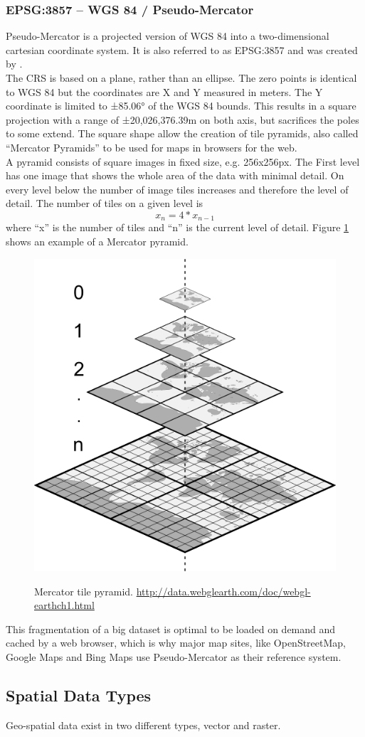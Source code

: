 \subsubsection{EPSG:3857 -- WGS 84 / Pseudo-Mercator}
Pseudo-Mercator is a projected version of WGS 84 into a two-dimensional cartesian coordinate system. It is also referred to as EPSG:3857 and was created by \cite{Grafarend1995}.\\
The CRS is based on a plane, rather than an ellipse. The zero points is identical to WGS 84 but the coordinates are X and Y measured in meters. The Y coordinate is limited to ±85.06° of the WGS 84 bounds. This results in a square projection with a range of ±20,026,376.39m on both axis, but sacrifices the poles to some extend. The square shape allow the creation of tile pyramids, also called \enquote{Mercator Pyramids} to be used for maps in browsers for the web. \\
A pyramid consists of square images in fixed size, e.g. 256x256px. The First level has one image that shows the whole area of the data with minimal detail. On every level below the number of image tiles increases and therefore the level of detail. The number of tiles on a given level is
$$x_n= 4* x_{n-1}$$ 
where \enquote{x} is the number of tiles and \enquote{n} is the current level of detail. Figure \ref{img:mercator-pyramid} shows an example of a Mercator pyramid.
\begin{figure}[H]
	\centering
	\includegraphics[width=0.4\columnwidth]{res/mercator-pyramid}\\
	\caption[]{Mercator tile pyramid. \url{http://data.webglearth.com/doc/webgl-earthch1.html}}
	\label{img:mercator-pyramid}
\end{figure}
This fragmentation of a big dataset is optimal to be loaded on demand and cached by a web browser, which is why major map sites, like OpenStreetMap, Google Maps and Bing Maps use Pseudo-Mercator as their reference system.


\subsection{Spatial Data Types}
Geo-spatial data exist in two different types, vector and raster. 

